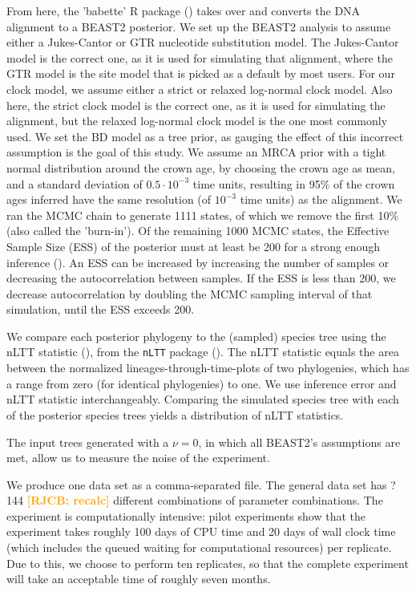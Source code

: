 \documentclass{article}
\newcommand*\richel[1]{\textcolor{orange}{\textbf{[RJCB: #1]}}}
\begin{document}
From here, the 'babette' R package (\cite{babette})
takes over and converts the DNA alignment to a BEAST2 posterior.
We set up the BEAST2 analysis to assume either a Jukes-Cantor or GTR nucleotide substitution model.
The Jukes-Cantor model is the correct one, as it is used for simulating that alignment,
where the GTR model is the site model that is picked as a default by most users.
For our clock model, we assume either a strict or relaxed log-normal 
clock model. 
Also here, the strict clock model is the correct one, as it is used for simulating the alignment,
but the relaxed log-normal clock model is the one most commonly used.
We set the BD model as a tree prior, 
as gauging the effect of this incorrect assumption is the goal of this study. 
We assume an MRCA prior with a tight normal distribution
around the crown age, by choosing the crown age as mean, and a standard deviation 
of $0.5 \cdot 10^{-3}$ time units,
resulting in 95\% of the crown ages inferred have the same resolution (of $10^{-3}$ time 
units) as the alignment. 
We ran the MCMC chain to generate 1111 states,
of which we remove the first 10\% (also called the 'burn-in'). 
Of the remaining
1000 MCMC states, the Effective Sample Size (ESS) of the posterior 
must at least be 200
for a strong enough inference (\cite{beastbook}). An ESS can be increased by increasing
the number of samples or decreasing the autocorrelation between samples. 
If the ESS is less than 200, we decrease autocorrelation by doubling 
the MCMC sampling interval of that simulation, until the ESS exceeds 200.

We compare each posterior phylogeny to the (sampled) species tree
using the nLTT statistic (\cite{janzen2015}), from the \verb;nLTT; package (\cite{nltt}). 
The nLTT statistic equals the area between the normalized
lineages-through-time-plots of two phylogenies, which has a range 
from zero (for identical phylogenies) to one. We use inference error 
and nLTT statistic interchangeably. Comparing the simulated species tree
with each of the posterior species trees yields a distribution of nLTT statistics. 

The input trees generated with a $\nu = 0$, 
in which all BEAST2's
assumptions are met,
allow us to measure the noise of the experiment.

We produce one data set as a comma-separated file.
The general data set has ?144 \richel{recalc} different combinations
of parameter combinations.
The experiment is computationally intensive:
pilot experiments show that the experiment takes roughly 100 days
of CPU time and 20 days of wall clock time (which includes the queued 
waiting for computational resources) per replicate. 
Due to this, we choose to perform ten replicates, so that the complete
experiment will take an acceptable time of roughly seven months. 
\end{document}
